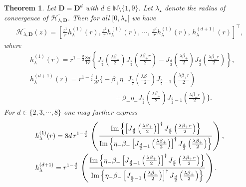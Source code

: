 \documentclass[11pt,a4paper,english,reqno]{amsart}
\theoremstyle{plain}
\newtheorem{theorem}[definition]{Theorem}
\newcommand{\1}{\mathbbm{1}}
\begin{document}
\begin{theorem}\label{thm: d-disk, PDE sol}
Let $\mathbf{D} = \mathbf{D}^{d}$ with $d \in \mathbb{N}\setminus \{1,9\}$. Let $\lambda_\star$ denote the radius of convergence of $\overline{\mathcal{H}_{\lambda, \mathbf{D}}}$. Then for all $[0, \lambda_\star[$ we have
\begin{align}\label{new, B}
    \overline{\mathcal{H}_{\lambda, \mathbf{D}}}(z)  = \left[
\frac{z^{1}}{r}h_{ \lambda}^{(1)}(r),\frac{z^{2}}{r}h_{ \lambda}^{(1)}(r),\, \cdots ,\,\frac{z^{d}}{r}h_{ \lambda}^{(1)}(r),\, h^{(d+1)}_{\lambda}(r) \right]^\top,
\end{align}
where
\begin{align}
&h_{\lambda}^{(1)}(r) = r^{1-\frac{d}{2}  }\frac{8d}{{\mathcal{W}}} \left\{J_{\frac{d}{2}}\left(\frac{\lambda\beta_-}{2}\right) J_{\frac{d}{2}}\left( \frac{\lambda  \beta_+ r}{2}\right) - J_{\frac{d}{2}}\left(\frac{\lambda\beta_+}{2}\right) J_{\frac{d}{2}}\left( \frac{\lambda \beta_- r}{2}\right)\right\},\label{B, sol, arb dim}\\
&h_{\lambda}^{(d+1)}(r) = r^{1-\frac{d}{2} }\frac{1}{{\mathcal{W}}} \bigg\{-\beta_+\eta_+   J_{\frac{d}{2}}\left(\frac{\lambda\beta_-}{2}\right) J_{\frac{d}{2}-1} \left( \frac{\lambda \beta_+ r}{2}\right)\nonumber\\
&\qquad\qquad\qquad\qquad\qquad\qquad +\beta_-\eta_-  J_{\frac{d}{2}}\left(\frac{\lambda\beta_+}{2}\right) J_{\frac{d}{2}-1}\left( \frac{\lambda \beta_- r}{2}\right)\bigg\}.\label{D, sol, arb dim}
\end{align}
For $d \in \{2, 3, \cdots, 8\}$ one may further express
\begin{align}
& h_{\lambda}^{(1)} (r) =  8d\,r^{1-\frac{d}{2}}\,\left(\frac{{\rm Im}\left\{\left[J_{\frac{d}{2}}\left(\frac{\lambda\beta_+}{2}\right)\right]^\dagger J_{\frac{d}{2}}\left(\frac{\lambda\beta_+ r}{2}\right) \right\}}{{\rm Im}\left\{\eta_-\beta_-\left[J_{\frac{d}{2}-1}\left(\frac{\lambda\beta_+}{2}\right)\right]^\dagger J_{\frac{d}{2}}\left(\frac{\lambda\beta_+}{2}\right) \right\}}\right),\label{AC for blowup, arb dim 1}\\
& h_{\lambda}^{(d+1)} = r^{1-\frac{d}{2}}\,\left(\frac{{\rm Im}\left\{\eta_{-}\beta_{-}\left[J_{\frac{d}{2}-1}\left(\frac{\lambda\beta_+}{2}\right)\right]^\dagger J_{\frac{d}{2}}\left(\frac{\lambda\beta_+ r}{2}\right) \right\}}{{\rm Im}\left\{\eta_-\beta_-\left[J_{\frac{d}{2}-1}\left(\frac{\lambda\beta_+}{2}\right)\right]^\dagger J_{\frac{d}{2}}\left(\frac{\lambda\beta_+}{2}\right) \right\}}\right)\label{AC for blowup, arb dim 2}.
\end{align}
\end{theorem}
\end{document}
